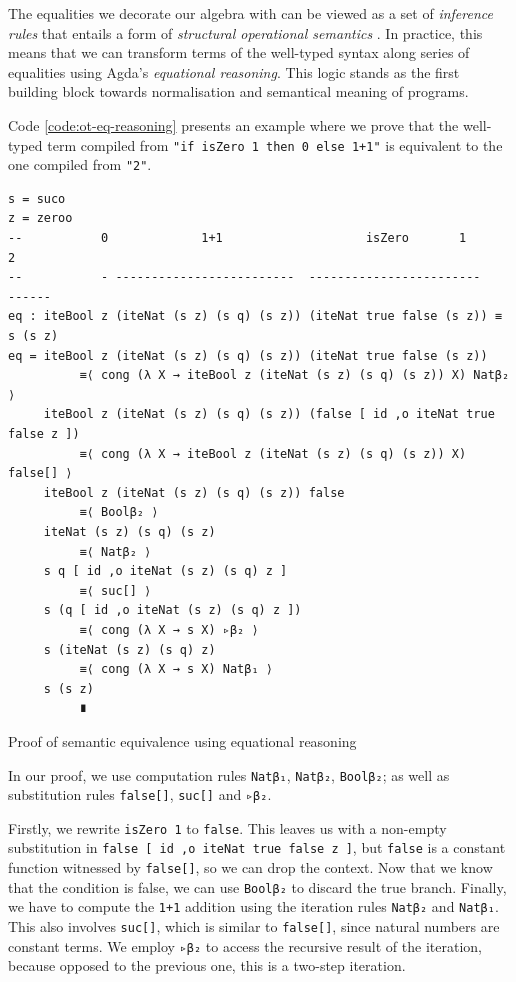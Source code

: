 The equalities we decorate our algebra with can be viewed as a set of \textit{inference rules} that entails a form of \textit{structural operational semantics} \cite{plotkin1981structural}. In practice, this means that we can transform terms of the well-typed syntax along series of equalities using Agda's \textit{equational reasoning}. This logic stands as the first building block towards normalisation and semantical meaning of programs.

Code \ref{code:ot-eq-reasoning} presents an example where we prove that the well-typed term compiled from \verb$"if isZero 1 then 0 else 1+1"$ is equivalent to the one compiled from \verb$"2"$.

\begin{listing}[H]
\begin{verbatim}
s = suco
z = zeroo
--           0             1+1                    isZero       1        2
--           - -------------------------  ------------------------    ------
eq : iteBool z (iteNat (s z) (s q) (s z)) (iteNat true false (s z)) ≡ s (s z)
eq = iteBool z (iteNat (s z) (s q) (s z)) (iteNat true false (s z))
          ≡⟨ cong (λ X → iteBool z (iteNat (s z) (s q) (s z)) X) Natβ₂ ⟩
     iteBool z (iteNat (s z) (s q) (s z)) (false [ id ,o iteNat true false z ])
          ≡⟨ cong (λ X → iteBool z (iteNat (s z) (s q) (s z)) X) false[] ⟩
     iteBool z (iteNat (s z) (s q) (s z)) false
          ≡⟨ Boolβ₂ ⟩
     iteNat (s z) (s q) (s z)
          ≡⟨ Natβ₂ ⟩
     s q [ id ,o iteNat (s z) (s q) z ]
          ≡⟨ suc[] ⟩
     s (q [ id ,o iteNat (s z) (s q) z ])
          ≡⟨ cong (λ X → s X) ▹β₂ ⟩
     s (iteNat (s z) (s q) z)
          ≡⟨ cong (λ X → s X) Natβ₁ ⟩
     s (s z)
          ∎
\end{verbatim}
\caption{Proof of semantic equivalence using equational reasoning}
\label{code:ot-eq-reasoning}
\end{listing}

In our proof, we use computation rules \verb$Natβ₁$, \verb$Natβ₂$, \verb$Boolβ₂$; as well as substitution rules \verb$false[]$, \verb$suc[]$ and \verb$▹β₂$.

Firstly, we rewrite \verb$isZero 1$ to \verb$false$. This leaves us with a non-empty substitution in \verb$false [ id ,o iteNat true false z ]$, but \verb$false$ is a constant function witnessed by \verb$false[]$, so we can drop the context. Now that we know that the condition is false, we can use \verb$Boolβ₂$ to discard the true branch. Finally, we have to compute the \verb$1+1$ addition using the iteration rules \verb$Natβ₂$ and \verb$Natβ₁$. This also involves \verb$suc[]$, which is similar to \verb$false[]$, since natural numbers are constant terms. We employ \verb$▹β₂$ to access the recursive result of the iteration, because opposed to the previous one, this is a two-step iteration.

